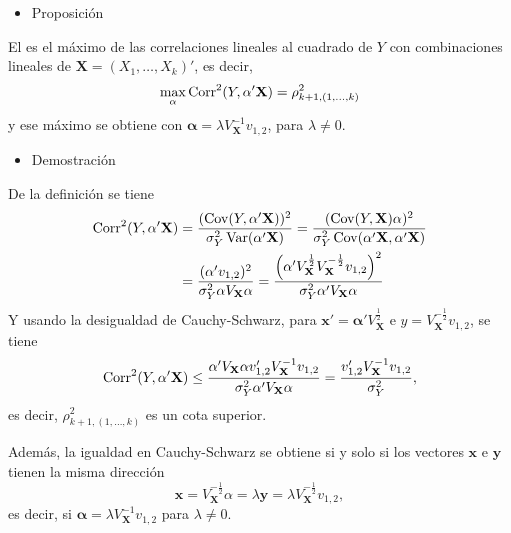 \begin{itemize}[label=\color{red}\textbullet, leftmargin=*]
	\item \color{lightblue}Proposición
\end{itemize}
El  es el máximo de las correlaciones lineales al cuadrado de $Y$ con combinaciones lineales de $\mathbf{X}=(X_1,\dots,X_k)'$, es decir, \[ \max_{\alpha}\operatorname{Corr}^2(Y,\mathbf{\alpha'X})=\rho_{k+1,(1,\dots,k)}^2 \]y ese máximo se obtiene con $\mathbf{\alpha}=\lambda V_\mathbf{X}^{-1}v_{1,2}$, para $\lambda\neq0$.
\begin{itemize}[label=\color{red}\textbullet, leftmargin=*]
	\item \color{lightblue}Demostración
\end{itemize}
De la definición se tiene \[ \begin{aligned}
	\operatorname{Corr}^2(Y,\mathbf{\alpha'X})&=\dfrac{(\operatorname{Cov}(Y,\mathbf{\alpha'X}))^2}{\sigma_Y^2\operatorname{Var}(\mathbf{\alpha'X})}=\dfrac{(\operatorname{Cov}(Y,\mathbf{X})\mathbf{\alpha})^2}{\sigma_Y^2\operatorname{Cov}(\mathbf{\alpha'X},\mathbf{\alpha'X})}\\
	&=\dfrac{(\mathbf{\alpha'}v_{1,2})^2}{\sigma_Y^2\mathbf{\alpha}V_\mathbf{X}\mathbf{\alpha}}=\dfrac{\left(\mathbf{\alpha'}V_{\mathbf{X}}^{\frac{1}{2}}V_{\mathbf{X}}^{-\frac{1}{2}}v_{1,2}\right)^2}{\sigma_Y^2\mathbf{\alpha'}V_{\mathbf{X}}\mathbf{\alpha}}
\end{aligned} \]
Y usando la desigualdad de Cauchy-Schwarz, para $\mathbf{x'}=\mathbf{\alpha'}V_{\mathbf{X}}^{\frac{1}{2}}$ e $y=V_{\mathbf{X}}^{-\frac{1}{2}}v_{1,2}$, se tiene \[ \operatorname{Corr}^2(Y,\mathbf{\alpha'X})\le\dfrac{\mathbf{\alpha'}V_\mathbf{X}\mathbf{\alpha}v_{1,2}'V_\mathbf{X}^{-1}v_{1,2}}{\sigma_Y^2\mathbf{\alpha'}V_{\mathbf{X}}\mathbf{\alpha}}=\dfrac{v_{1,2}'V_{\mathbf{X}}^{-1}v_{1,2}}{\sigma_Y^2}, \]es decir, $\rho_{k+1,(1,\dots,k)}^2$ es un cota superior.

Además, la igualdad en Cauchy-Schwarz se obtiene si y solo si los vectores $\mathbf{x}$ e $\mathbf{y}$ tienen la misma dirección\[ \mathbf{x}=V_{\mathbf{X}}^{-\frac{1}{2}}\alpha=\lambda\mathbf{y}=\lambda V_{\mathbf{X}}^{-\frac{1}{2}}v_{1,2}, \]es decir, si $\mathbf{\alpha}=\lambda V_{\mathbf{X}}^{-1}v_{1,2}$ para $\lambda\neq0$.
